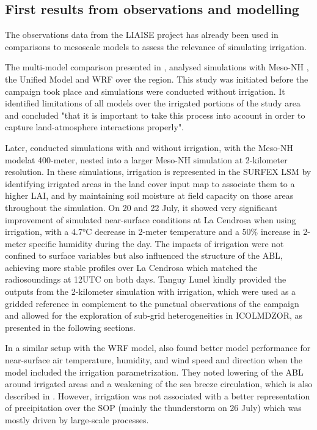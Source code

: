 \subsection{First results from observations and modelling}

The observations data from the LIAISE project has already been used in comparisons to mesoscale models to assess the relevance of simulating irrigation. 

The multi-model comparison presented in \citet{jimenez_land-surface_2025}, analysed simulations with Meso-NH  \citep{lac_overview_2018}, the Unified Model \citep{bush_second_2023,walters_met_2017} and WRF \citep{skamarock2021description} over the region. This study was initiated before the campaign took place and simulations were conducted without irrigation. It identified limitations of all models over the irrigated portions of the study area and concluded "that it is important to take this process into account in order to capture land-atmosphere interactions properly".

Later, \citet{lunel_irrigation_2024} conducted simulations with and without irrigation, with the Meso-NH modelat 400-meter, nested into a larger Meso-NH simulation at 2-kilometer resolution. 
In these simulations, irrigation is represented in the SURFEX LSM \citep[Surface Externalisée][]{masson_surfexv72_2013} by identifying irrigated areas in the land cover input map to associate them to a higher LAI, and by maintaining soil moisture at field capacity on those areas throughout the simulation.
On 20 and 22 July, it showed very significant improvement of simulated near-surface conditions at La Cendrosa when using irrigation, with a 4.7°C decrease in 2-meter temperature and a 50\% increase in 2-meter specific humidity during the day. The impacts of irrigation were not confined to surface variables but also influenced the structure of the ABL, achieving more stable profiles over La Cendrosa which matched the radiosoundings at 12UTC on both days. 
Tanguy Lunel kindly provided the outputs from the 2-kilometer simulation with irrigation, which were used as a gridded reference in complement to the punctual observations of the campaign and allowed for the exploration of sub-grid heterogeneities in ICOLMDZOR, as presented in the following sections.

In a similar setup with the WRF model, \citet{udina_irrigation_2024} also found better model performance for near-surface air temperature, humidity, and wind speed and direction when the model included the irrigation parametrization. They noted lowering of the ABL around irrigated areas and a weakening of the sea breeze circulation, which is also described in \citet{lunel_marinada_2024}.
However, irrigation was not associated with a better representation of precipitation over the SOP (mainly the thunderstorm on 26 July) which was mostly driven by large-scale processes.

